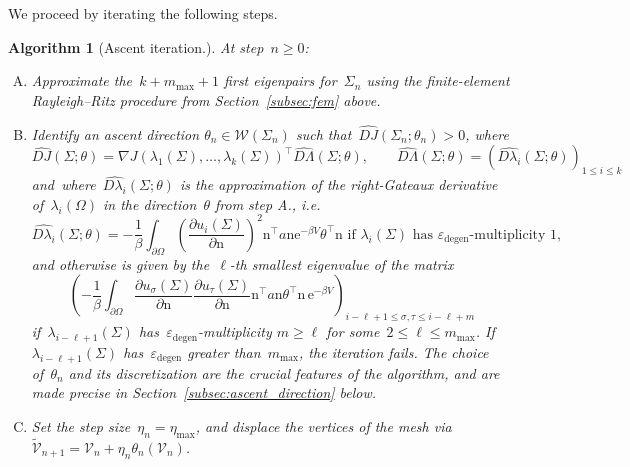 \documentclass[a4]{article}
\newcommand{\e}{\mathrm{e}}
\newcommand{\n}{\mathrm{n}}
\newcommand{\1}{\mathbbm 1}
\newtheorem{algorithm}{Algorithm}
\begin{document}
We proceed by iterating the following steps.
\begin{algorithm}[Ascent iteration.]
\label{alg:ascent}
At step~$n\geq 0$:
\begin{enumerate}[A.]
    \item{Approximate the~$k+m_{\mathrm{max}}+1$ first eigenpairs for~$\Sigma_n$ using the finite-element Rayleigh--Ritz procedure from Section~\ref{subsec:fem} above.}
    \item{Identify an ascent direction $\theta_n\in \mathcal W(\Sigma_n)$ such that~$\widehat{DJ}(\Sigma_n;\theta_n)>0$, where
    \begin{equation}
        \label{eq:directional_derivative}
        \widehat{DJ}(\Sigma;\theta) = \nabla J(\lambda_1(\Sigma),\dots,\lambda_k(\Sigma))^\top \widehat{D\Lambda}(\Sigma;\theta),\qquad \widehat{D\Lambda}(\Sigma;\theta) = \left(\widehat{D\lambda_i}(\Sigma;\theta)\right)_{1\leq i\leq k}
    \end{equation}
    and~where~$\widehat{D\lambda_i}(\Sigma;\theta)$ is the approximation of the right-Gateaux derivative of~$\lambda_i(\Omega)$ in the direction~$\theta$ from step A., i.e.
    \begin{equation}
        \label{eq:directional_derivative_approx_simple}
        \widehat{D\lambda_i}(\Sigma;\theta) = 
            -\frac1\beta\int_{\partial\Omega} \left(\frac{\partial u_i(\Sigma)}{\partial\n}\right)^2 \n^\top a\n \e^{-\beta V}\theta^\top\n \text{ if }\lambda_i(\Sigma)\text{ has~$\varepsilon_{\mathrm{degen}}$-multiplicity } 1,
    \end{equation}
    and otherwise is given by the~$\ell$-th smallest eigenvalue of the matrix
    \begin{equation}
        \label{eq:directional_derivative_approx_multiple}
        \left(-\frac1\beta\int_{\partial\Omega} \frac{\partial u_\sigma(\Sigma)}{\partial\n}\frac{\partial u_\tau(\Sigma)}{\partial\n} \n^\top a\n\theta^\top\n\,\e^{-\beta V}\right)_{i-\ell+1\leq \sigma,\tau\leq i-\ell+m}
    \end{equation}
    if~$\lambda_{i-\ell+1}(\Sigma)$ has~$\varepsilon_{\mathrm{degen}}$-multiplicity $m\geq \ell$ for some~$2\leq\ell\leq m_{\max}$. If~$\lambda_{i-\ell+1}(\Sigma)$ has~$\varepsilon_{\mathrm{degen}}$ greater than~$m_{\max}$, the iteration fails. The choice of~$\theta_n$ and its discretization are the crucial features of the algorithm, and are made precise in Section~\ref{subsec:ascent_direction} below.}
    \item{Set the step size~$\eta_n =\eta_{\max}$, and displace the vertices of the mesh via~$\widetilde{ \mathcal V}_{n+1} = \mathcal{V}_n + \eta_n \theta_n(\mathcal V_n)$.
}
\end{enumerate}
\end{algorithm}
\end{document}
